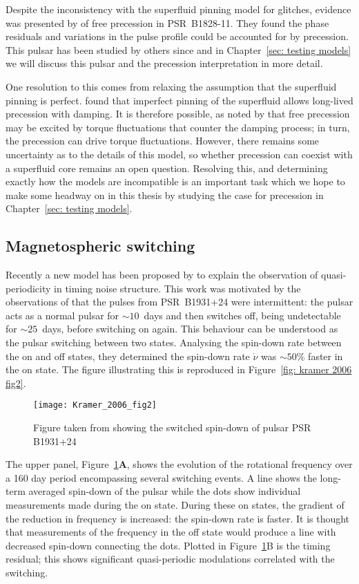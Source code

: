 Despite the inconsistency with the superfluid pinning model for glitches,
evidence was presented by \citet{Stairs2000} of free precession in
PSR~B1828-11. They found the phase residuals and variations in the pulse profile
could be accounted for by precession. This pulsar has been studied by others
since and in Chapter~\ref{sec: testing models} we will discuss this pulsar and
the precession interpretation in more detail.

One resolution to this comes from relaxing the assumption that the superfluid
pinning is perfect. \citet{Sedrakian1999} found that imperfect pinning of the
superfluid allows long-lived precession with damping. It is therefore possible,
as noted by \citet{Cordes1993} that free precession may be excited by torque
fluctuations that counter the damping process; in turn, the precession can
drive torque fluctuations. However, there remains some uncertainty as to the
details of this model, so whether precession can coexist with a superfluid core
remains an open question. Resolving this, and determining exactly how the
models are incompatible is an important task which we hope to make some headway
on in this thesis by studying the case for precession in Chapter~\ref{sec:
testing models}.


\subsection{Magnetospheric switching}
\label{sec: two state switching}

Recently a new model has been proposed by \citet{Lyne2010} to explain the
observation of quasi-periodicity in timing noise structure.
This work was motivated by the observations of \citet{Kramer2006} that the
pulses from PSR~B1931+24 were intermittent: the pulsar acts as a normal pulsar
for $\sim10$~days and then switches off, being undetectable for $\sim25$~days,
before switching on again. This behaviour can be understood as the pulsar switching
between two states. Analysing the spin-down rate between the on and off
states, they determined the spin-down rate $\dot{\nu}$ was $\sim50\%$ faster in
the on state. The figure illustrating this is reproduced in Figure~\ref{fig:
kramer 2006 fig2}.
\begin{figure}
    \centering
    \texttt{[image: Kramer\_2006\_fig2]}
    \caption{Figure taken from \citet{Kramer2006} showing the switched spin-down
             of pulsar PSR B1931+24}
    \label{fig: kramer 2006 fig2}
\end{figure}
The  upper panel, Figure~\ref{fig: kramer 2006 fig2}\textbf{A}, shows the
evolution of the rotational frequency over a 160 day period encompassing
several switching events. A line shows the long-term averaged spin-down of
the pulsar while the dots show individual measurements made during the on
state. During these on states, the gradient of the reduction in frequency is
increased: the spin-down rate is faster.  It is thought that measurements of
the frequency in the off state would produce a line with decreased spin-down
connecting the dots. Plotted in Figure~\ref{fig: kramer 2006 fig2}\textrm{B} is
the timing residual; this shows significant quasi-periodic modulations
correlated with the switching.

